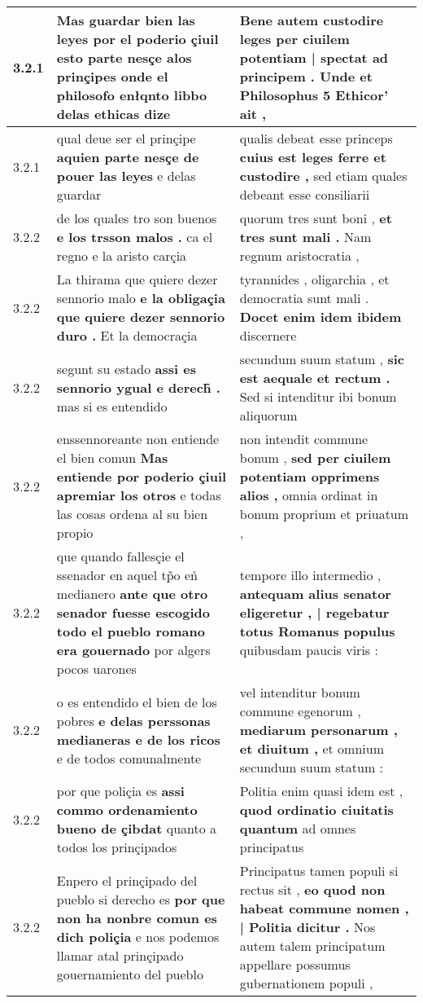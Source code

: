 \begin{tabular}{|p{1cm}|p{6.5cm}|p{6.5cm}|}
3.2.1 & Mas guardar bien las leyes \textbf{ por el poderio çiuil esto parte nesçe alos prinçipes } onde el philosofo enłqnto libbo delas ethicas dize & Bene autem custodire leges \textbf{ per ciuilem potentiam | spectat ad principem . } Unde et Philosophus 5 Ethicor’ ait , \\\hline
3.2.1 & qual deue ser el prinçipe \textbf{ aquien parte nesçe de pouer las leyes } e delas guardar & qualis debeat esse princeps \textbf{ cuius est leges ferre et custodire , } sed etiam quales debeant esse consiliarii \\\hline
3.2.2 & de los quales tro son buenos \textbf{ e los trsson malos . } ca el regno e la aristo carçia & quorum tres sunt boni , \textbf{ et tres sunt mali . } Nam regnum aristocratia , \\\hline
3.2.2 & La thirama que quiere dezer sennorio malo \textbf{ e la obligaçia que quiere dezer sennorio duro . } Et la democraçia & tyrannides , oligarchia , et democratia sunt mali . \textbf{ Docet enim idem ibidem } discernere \\\hline
3.2.2 & segunt su estado \textbf{ assi es sennorio ygual e derech̃ . } mas si es entendido & secundum suum statum , \textbf{ sic est aequale et rectum . } Sed si intenditur ibi bonum aliquorum \\\hline
3.2.2 & enssennoreante non entiende el bien comun \textbf{ Mas entiende por poderio çiuil apremiar los otros } e todas las cosas ordena al su bien propio & non intendit commune bonum , \textbf{ sed per ciuilem potentiam opprimens alios , } omnia ordinat in bonum proprium et priuatum , \\\hline
3.2.2 & que quando fallesçie el ssenador en aquel tp̃o en̊ medianero \textbf{ ante que otro senador fuesse escogido todo el pueblo romano era gouernado } por algers pocos uarones & tempore illo intermedio , \textbf{ antequam alius senator eligeretur , | regebatur totus Romanus populus } quibusdam paucis viris : \\\hline
3.2.2 & o es entendido el bien de los pobres \textbf{ e delas perssonas medianeras e de los ricos } e de todos comunalmente & vel intenditur bonum commune egenorum , \textbf{ mediarum personarum , et diuitum , } et omnium secundum suum statum : \\\hline
3.2.2 & por que poliçia es \textbf{ assi commo ordenamiento bueno de çibdat } quanto a todos los prinçipados & Politia enim quasi idem est , \textbf{ quod ordinatio ciuitatis quantum } ad omnes principatus \\\hline
3.2.2 & Enpero el prinçipado del pueblo si derecho es \textbf{ por que non ha nonbre comun es dich poliçia } e nos podemos llamar atal prinçipado gouernamiento del pueblo & Principatus tamen populi si rectus sit , \textbf{ eo quod non habeat commune nomen , | Politia dicitur . } Nos autem talem principatum appellare possumus gubernationem populi , \\\hline

\end{tabular}
